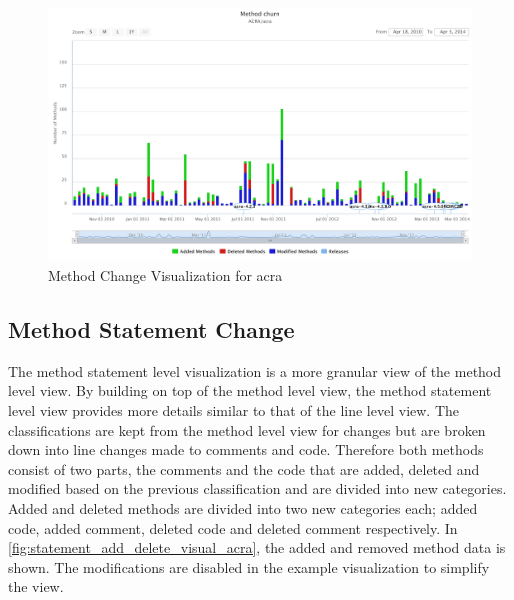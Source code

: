 
\begin{landscape}
\thispagestyle{empty}
 \begin{figure}
  \centering
    \includegraphics[width=1.5\textwidth]{images/method_visual_acra}
    \caption{Method Change Visualization for acra}
    \label{fig:method_visual_acra}
 \end{figure}
\end{landscape}
\thispagestyle{plain}


\subsection{Method Statement Change}

The method statement level visualization is a more granular view of the method level view. By building on top of the method level view, the method statement level view provides more details similar to that of the line level view. The classifications are kept from the method level view for changes but are broken down into line changes made to comments and code. Therefore both methods consist of two parts, the comments and the code that are added, deleted and modified based on the previous classification and are divided into new categories. Added and deleted methods are divided into two new categories each; added code, added comment, deleted code and deleted comment respectively. In \autoref{fig:statement_add_delete_visual_acra}, the added and removed method data is shown. The modifications are disabled in the example visualization to simplify the view.

